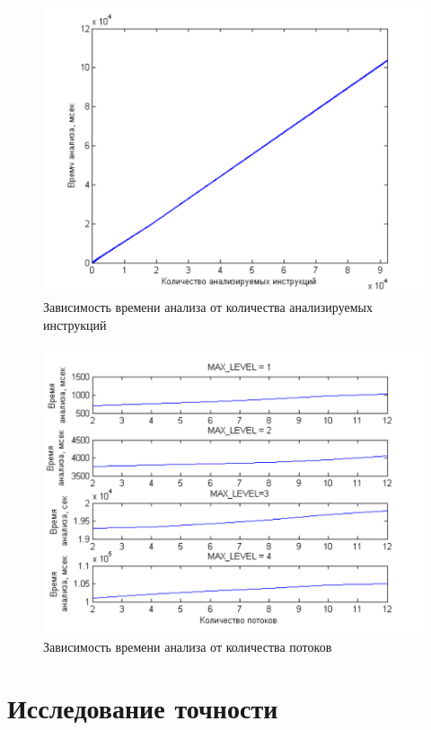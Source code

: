 \begin{figure}
  \centering
  \includegraphics[width=\textwidth]{inc/png/graphic4}
  \caption{Зависимость времени анализа от количества анализируемых инструкций}
  \label{fig:graphic4}
\end{figure}

\begin{figure}
  \centering
  \includegraphics[width=\textwidth]{inc/png/graphic5}
  \caption{Зависимость времени анализа от количества потоков}
  \label{fig:graphic5}
\end{figure}


\section{Исследование точности}

